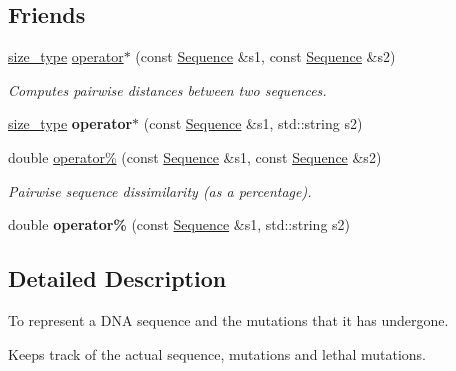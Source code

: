 \subsection*{Friends}
\textbf{ }\par
\begin{DoxyCompactItemize}
\item 
\hyperlink{constants_8h_a8e1541b50cee66a791df4c437ccbb385}{size\+\_\+type} \hyperlink{classretrocombinator_1_1Sequence_a8cd9dc2cfea97399387e2876ee028c32}{operator$\ast$} (const \hyperlink{classretrocombinator_1_1Sequence}{Sequence} \&s1, const \hyperlink{classretrocombinator_1_1Sequence}{Sequence} \&s2)
\begin{DoxyCompactList}\small\item\em Computes pairwise distances between two sequences. \end{DoxyCompactList}\item 
\mbox{\label{classretrocombinator_1_1Sequence_afdd1af7009804b182798c40d25bb1bb5}} 
\hyperlink{constants_8h_a8e1541b50cee66a791df4c437ccbb385}{size\+\_\+type} {\bfseries operator$\ast$} (const \hyperlink{classretrocombinator_1_1Sequence}{Sequence} \&s1, std\+::string s2)
\item 
double \hyperlink{classretrocombinator_1_1Sequence_a951eb38b75bb0b9a808e3a8bc7170a09}{operator\%} (const \hyperlink{classretrocombinator_1_1Sequence}{Sequence} \&s1, const \hyperlink{classretrocombinator_1_1Sequence}{Sequence} \&s2)
\begin{DoxyCompactList}\small\item\em Pairwise sequence dissimilarity (as a percentage). \end{DoxyCompactList}\item 
\mbox{\label{classretrocombinator_1_1Sequence_a56fd21ad6db6a3cb7f7f4b9b5b6c84ea}} 
double {\bfseries operator\%} (const \hyperlink{classretrocombinator_1_1Sequence}{Sequence} \&s1, std\+::string s2)
\end{DoxyCompactItemize}



\subsection{Detailed Description}
To represent a D\+NA sequence and the mutations that it has undergone. 

Keeps track of the actual sequence, mutations and lethal mutations. 

